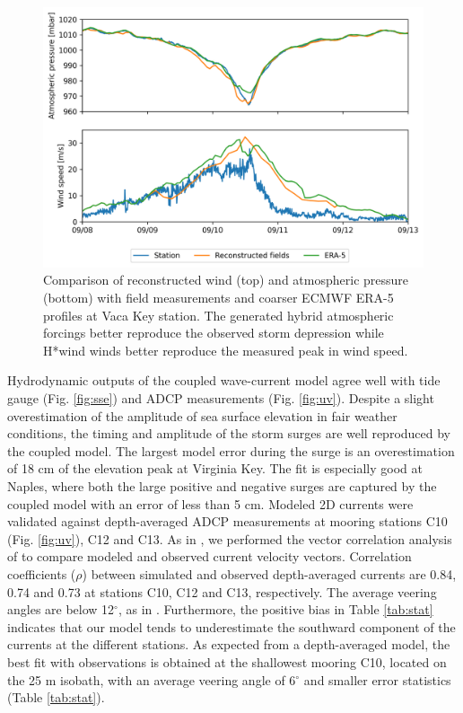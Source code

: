 \documentclass[preprint,12pt,authoryear]{elsarticle}
\begin{document}
\begin{figure}
    \centering
    \includegraphics[width=.95\textwidth]{validation_met_2.png}
    \caption{Comparison of reconstructed wind (top) and atmospheric pressure (bottom) with field measurements and coarser ECMWF ERA-5 profiles at Vaca Key station. The generated hybrid atmospheric forcings better reproduce the observed storm depression while H*wind winds better reproduce the measured peak in wind speed.}
    \label{fig:forcings}
\end{figure}

Hydrodynamic outputs of the coupled wave-current model agree well with tide gauge (Fig. \ref{fig:sse}) and ADCP measurements (Fig. \ref{fig:uv}). Despite a slight overestimation of the amplitude of sea surface elevation in fair weather conditions, the timing and amplitude of the storm surges are well reproduced by the coupled model. The largest model error during the surge is an overestimation of 18 cm of the elevation peak at Virginia Key. The fit is especially good at Naples, where both the large positive and negative surges are captured by the coupled model with an error of less than 5 cm. Modeled 2D currents were validated against depth-averaged ADCP measurements at mooring stations C10 (Fig. \ref{fig:uv}), C12 and C13. As in \cite{liu2020impacts}, we performed the vector correlation analysis of \cite{kundu1976ekman} to compare modeled and observed current velocity vectors. Correlation coefficients ($\rho$) between simulated and observed depth-averaged currents are 0.84, 0.74 and 0.73 at stations C10, C12 and C13, respectively. The average veering angles are below 12$^\circ$, as in \citep{liu2020impacts}. Furthermore, the positive bias in Table \ref{tab:stat} indicates that our model tends to underestimate the southward component of the currents at the different stations. As expected from a depth-averaged model, the best fit with observations is obtained at the shallowest mooring C10, located on the 25 m isobath, with an average veering angle of 6$^\circ$ and smaller error statistics (Table \ref{tab:stat}). 
\end{document}
